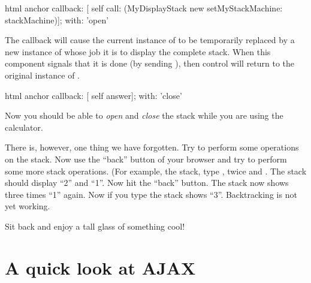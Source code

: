 \documentclass[a4paper,10pt,twoside]{book}
\begin{document}
{{\begin{code}{}
html anchor
	callback: [ self call: (MyDisplayStack new setMyStackMachine: stackMachine)];
	with: 'open'
\end{code}


The callback will cause the current instance of  to be temporarily replaced by a new instance of  whose job it is to display the complete stack.
When this component signals that it is done (\ie by sending ), then control will return to the original instance of .


\begin{code}{}
html anchor
	callback: [ self answer];
	with: 'close'
\end{code}

Now you should be able to \emph{open} and \emph{close} the stack while you are using the calculator.

There is, however, one thing we have forgotten.
Try to perform some operations on the stack.
Now use the ``back'' button of your browser and try to perform some more stack operations.
(For example,  the stack, type ,  twice and \menu {+}.
The stack should display ``2'' and ``1''.
Now hit the ``back'' button.
The stack now shows three times ``1'' again.
Now if you type \menu{+} the stack shows ``3''.
Backtracking is not yet working.


Sit back and enjoy a tall glass of something cool!

\section{A quick look at AJAX}


}}
\end{document}
